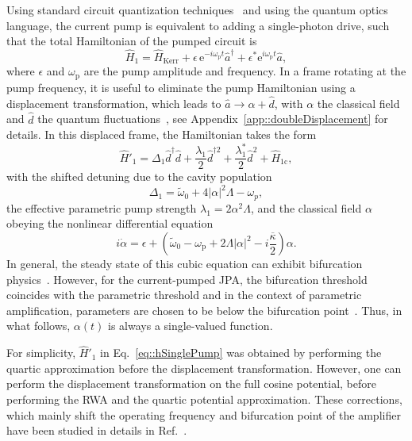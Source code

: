 \documentclass[pra,twocolumn,superscriptaddress]{revtex4-1}
\newcommand{\ah}[0]{\hat{a}}
\newcommand{\dhat}[0]{\hat{d}}
\newcommand{\lsp}[0]{\lambda_{\mathrm{1}}}
\newcommand{\Dsp}[0]{\Delta_{\mathrm{1}}}
\newcommand{\corrSinglePump}[0]{\hat{H}_{\mathrm{1c}}}
\newcommand{\wpump}[0]{\omega_{\mathrm{p}}}
\newcommand{\kappaTot}[0]{\overline{\kappa}}
\newcommand{\parO}[1]{\left(#1\right)}
\newcommand{\abs}[1]{\left|#1\right|}
\newcommand{\erm}[0]{\mathrm{e}}
\begin{document}
Using standard circuit quantization techniques~\cite{Devoret:1995fk} and using the quantum optics language, the current pump is equivalent to adding a single-photon drive, such that the total Hamiltonian of the pumped circuit is
\begin{equation}
	\hat{H}_{1} = \hat{H}_{\mathrm{Kerr} } 
	+ \epsilon\, \erm^{-i \wpump t} \ah^\dag 	+  \epsilon^* \erm^{i \wpump t} \ah,
	\label{eq:h1pump}
\end{equation}
where $\epsilon$ and $\wpump$ are the pump amplitude and frequency.
% 
In a frame rotating at the pump frequency, it is useful to eliminate the pump Hamiltonian using a displacement transformation, which leads to $\ah \rightarrow \alpha + \dhat$, with $\alpha$ the classical field and $\dhat$ the quantum fluctuations~\cite{Yurke:2006fk,Laflamme:2011vn}, see Appendix~\ref{app::doubleDisplacement} for details. In this displaced frame, the Hamiltonian takes the form
\begin{equation}
	\hat{H}'_{1}  = 
		\Dsp  \dhat^\dagger \dhat   + \frac{\lsp}{2} \dhat^{\dagger 2} + \frac{\lsp^*}{2} \dhat^2 
		+ \corrSinglePump,
	\label{eq::hSinglePump}
\end{equation}
with  the shifted detuning due to the cavity population
\begin{equation}
	\Dsp = \tilde{\omega}_0  + 4 \abs{\alpha}^{2} \Lambda  -\omega_p, 
\end{equation}
the effective parametric pump strength $\lsp = 2 \alpha^2 \Lambda$, and the classical field $\alpha$ obeying the nonlinear differential equation
\begin{equation}
	i\dot \alpha = \epsilon + \parO{\tilde{\omega}_0-\wpump +2 \Lambda \abs{\alpha}^2 -i \frac{\kappaTot}{2} }\alpha.
	\label{eq::alphaDot}
\end{equation}
In general, the steady state of this cubic equation can exhibit bifurcation physics~\cite{Yurke:2006fk,Manucharyan:2007fk}. However, for the current-pumped JPA, the bifurcation threshold coincides with the parametric threshold and in the context of parametric amplification, parameters are chosen to be below the bifurcation point~\cite{Laflamme:2011vn}. Thus,  in what follows, $\alpha(t)$ is always a single-valued function.

For simplicity, $\hat{H}'_{1}$ in Eq.~\eqref{eq::hSinglePump} was obtained by performing the quartic approximation before the displacement transformation. However, one can perform the displacement transformation on the full cosine potential, before performing the RWA and the quartic potential approximation. 
These corrections, which mainly shift the operating frequency and bifurcation point of the amplifier have been studied in details in Ref.~\cite{Kochetov:2015ab}.
\end{document}
